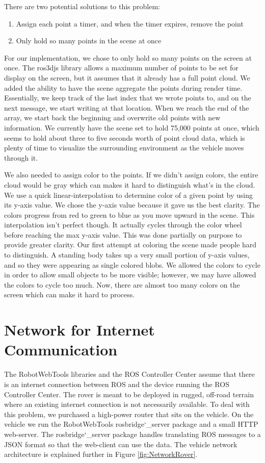 There are two potential solutions to this problem:
\begin{enumerate}
    \item Assign each point a timer, and when the timer expires, remove the point
    \item Only hold so many points in the scene at once
\end{enumerate}

For our implementation, we chose to only hold so many points on the screen at once.  The ros3djs library allows a maximum number of points to be set for display on the screen, but it assumes that it already has a full point cloud.  We added the ability to have the scene aggregate the points during render time.  Essentially, we keep track of the last index that we wrote points to, and on the next message, we start writing at that location.  When we reach the end of the array, we start back the beginning and overwrite old points with new information.  We currently have the scene set to hold 75,000 points at once, which seems to hold about three to five seconds worth of point cloud data, which is plenty of time to visualize the surrounding environment as the vehicle moves through it.

We also needed to assign color to the points.  If we didn't assign colors, the entire cloud would be gray which can makes it hard to distinguish what's in the cloud.  We use a quick linear-interpolation to determine color of a given point by using its y-axis value.  We chose the y-axis value because it gave us the best clarity.  The colors progress from red to green to blue as you move upward in the scene.  This interpolation isn't perfect though.  It actually cycles through the color wheel before reaching the max y-axis value.  This was done partially on purpose to provide greater clarity.  Our first attempt at coloring the scene made people hard to distinguish.  A standing body takes up a very small portion of y-axis values, and so they were appearing as single colored blobs.  We allowed the colors to cycle in order to allow small objects to be more visible; however, we may have allowed the colors to cycle too much.  Now, there are almost too many colors on the screen which can make it hard to process.


\section{Network for Internet Communication}The RobotWebTools libraries and the ROS Controller Center assume that there is an internet connection between ROS and the device running the ROS Controller Center.  The rover is meant to be deployed in rugged, off-road terrain where an existing internet connection is not necessarily available.  To deal with this problem, we purchased a high-power router that sits on the vehicle.  On the vehicle we run the RobotWebTools rosbridge\char`_server package and a small HTTP web-server.  The rosbridge\char`_server package handles translating ROS messages to a JSON format so that the web-client can use the data. The vehicle network architecture is explained further in Figure \ref{fig:NetworkRover}.

